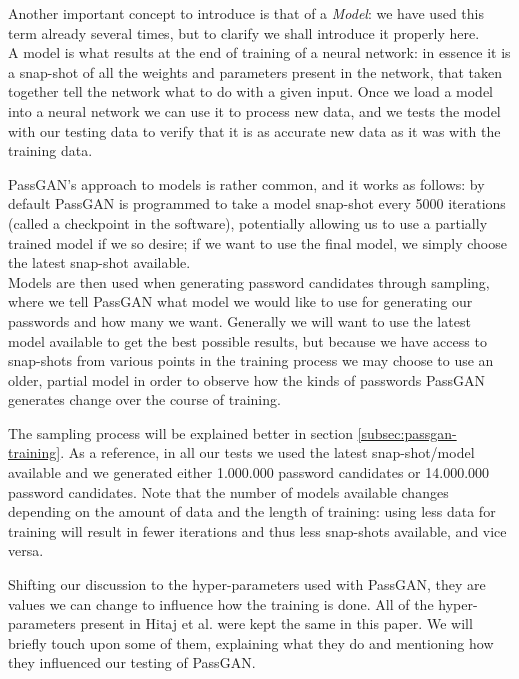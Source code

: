 Another important concept to introduce is that of a \emph{Model}: we have used this term already several times, but to clarify we shall introduce it properly here.\\
A model is what results at the end of training of a neural network: in essence it is a snap-shot of all the weights and parameters present in the network, that taken together tell the network what to do with a given input. Once we load a model into a neural network we can use it to process new data, and we tests the model with our testing data to verify that it is as accurate new data as it was with the training data.

PassGAN's approach to models is rather common, and it works as follows: by default PassGAN is programmed to take a model snap-shot every 5000 iterations (called a checkpoint in the software), potentially allowing us to use a partially trained model if we so desire; if we want to use the final model, we simply choose the latest snap-shot available.\\
Models are then used when generating password candidates through sampling, where we tell PassGAN what model we would like to use for generating our passwords and how many we want. Generally we will want to use the latest model available to get the best possible results, but because we have access to snap-shots from various points in the training process we may choose to use an older, partial model in order to observe how the kinds of passwords PassGAN generates change over the course of training.

The sampling process will be explained better in section \ref{subsec:passgan-training}. As a reference, in all our tests we used the latest snap-shot/model available and we generated either 1.000.000 password candidates or 14.000.000 password candidates.
Note that the number of models available changes depending on the amount of data and the length of training: using less data for training will result in fewer iterations and thus less snap-shots available, and vice versa.

Shifting our discussion to the hyper-parameters used with PassGAN, they are values we can change to influence how the training is done. All of the hyper-parameters present in Hitaj et al. \cite{PassGAN} were kept the same in this paper. We will briefly touch upon some of them, explaining what they do and mentioning how they influenced our testing of PassGAN.

